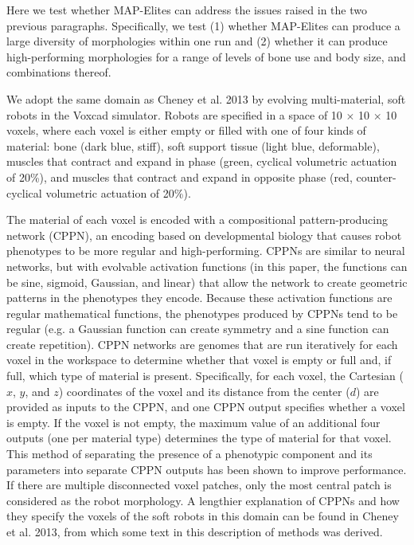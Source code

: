 \documentclass[twocolumn, DIV25, 9pt]{scrartcl}
\begin{document}
Here we test whether MAP-Elites can address the issues raised in the two previous paragraphs. Specifically, we test (1) whether MAP-Elites can produce a large diversity of morphologies within one run and (2) whether it can produce high-performing morphologies for a range of levels of bone use and body size, and combinations thereof.  

We adopt the same domain as Cheney et al. 2013\cite{cheney2013unshackling} by evolving multi-material, soft robots in the Voxcad simulator\cite{hiller2014dynamic}. Robots are specified in a space of 10 $\times$ 10 $\times$ 10 voxels, where each voxel is either empty or filled with one of four kinds of material: bone (dark blue,  stiff), soft support tissue (light blue, deformable), muscles that contract and expand in phase (green, cyclical volumetric actuation of 20\%), and muscles that contract and expand in opposite phase (red, counter-cyclical volumetric actuation of 20\%). 

The material of each voxel is encoded with a compositional pattern-producing network (CPPN)\cite{stanley2007compositional}, an encoding based on developmental biology that causes robot phenotypes to be more regular and high-performing\cite{stanley2007compositional, stanley2009hypercube, gauci2010autonomous, clune2011performance, yosinski2011gaits, lee2013evolving, cheney2013unshackling, cheney2014evolved,tarapore2015evolvability}.  
CPPNs are similar to neural networks, but with evolvable activation functions (in this paper, the functions can be sine, sigmoid, Gaussian, and linear) that allow the network to create geometric patterns in the phenotypes they encode. Because these activation functions are
regular mathematical functions, the phenotypes produced by CPPNs tend to
be regular (e.g. a Gaussian function can create symmetry and a sine function can create repetition). CPPN networks are genomes that are run iteratively for each voxel in the workspace to determine whether that voxel is empty or full and, if full, which type of material is present. Specifically, for each voxel, the Cartesian ($x$, $y$, and $z$) coordinates of the voxel and its distance from the center ($d$) are provided as inputs to the CPPN, and one CPPN output specifies whether a voxel is empty. If the voxel is not empty, the maximum value of an additional four outputs (one per material type) determines the type of material for that voxel. This method of separating the presence of a phenotypic component and its parameters into separate CPPN outputs has been shown to improve performance\cite{verbancsics2011constraining, huizinga2014evolving}.  If there are multiple disconnected voxel patches, only the most central patch is considered as the robot morphology. A lengthier explanation of CPPNs and how they specify the voxels of the soft robots in this domain can be found in Cheney et al. 2013\cite{cheney2013unshackling}, from which some text in this description of methods was derived. 
\end{document}
